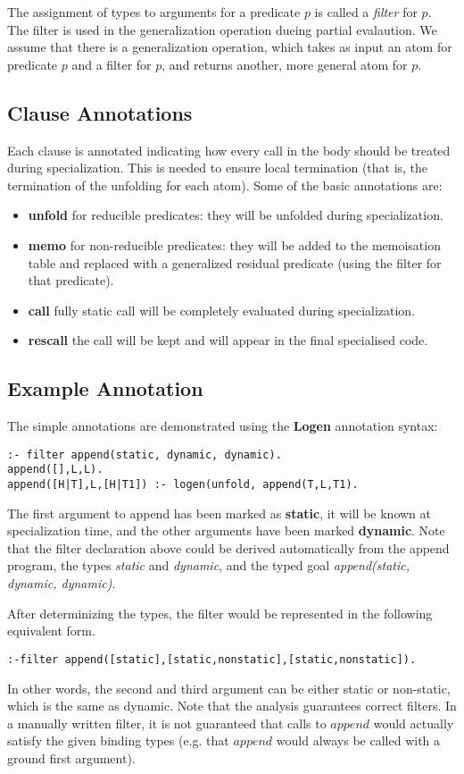 \documentclass[12pt,twoside]{article}
\begin{document}
The assignment of types to arguments for a predicate $p$ is called a {\em filter}
for $p$.  The filter is used in the generalization operation dueing partial
evalaution. We assume that there is a generalization operation, 
which takes as input an atom for predicate $p$ and a filter for $p$, 
and returns another, more general atom for $p$.

\subsection{Clause Annotations}
Each clause is annotated indicating how every call in the body should be treated during specialization.  This is needed to ensure local termination (that is, the termination of
the unfolding for each atom).
Some of the basic annotations are:
\begin{itemize}
\item {\bf unfold} for reducible predicates: they will be unfolded during specialization.
\item {\bf memo} for non-reducible predicates: they will be added to the memoisation table and replaced with a generalized residual predicate (using the filter for that predicate).
\item {\bf call} fully static call will be completely evaluated during specialization.
\item {\bf rescall} the call will be kept and will appear in the final specialised code.  
\end{itemize}


\subsection{Example Annotation}
The simple annotations are demonstrated using the {\bf Logen} annotation syntax:
\begin{verbatim}
:- filter append(static, dynamic, dynamic). 
append([],L,L).
append([H|T],L,[H|T1]) :- logen(unfold, append(T,L,T1).
\end{verbatim}
The first argument to append has been marked as {\bf static}, it will be known at specialization time, and the other arguments have been marked {\bf dynamic}.  
Note that the filter declaration above could be derived automatically from the append program, the types {\em static} and {\em dynamic}, and the typed goal {\em append(static, dynamic, dynamic)}.

After determinizing the types, the filter 
would be represented in the following equivalent form.
\begin{verbatim}
:-filter append([static],[static,nonstatic],[static,nonstatic]). 
\end{verbatim}
In other words, the second and third argument can be either static or non-static,
which is the same as dynamic.  Note that the analysis guarantees correct
filters.  In a manually written filter, it is not guaranteed that calls to $append$ would
actually satisfy the given binding types (e.g. that $append$ would always be
called with a ground first argument).
\end{document}
